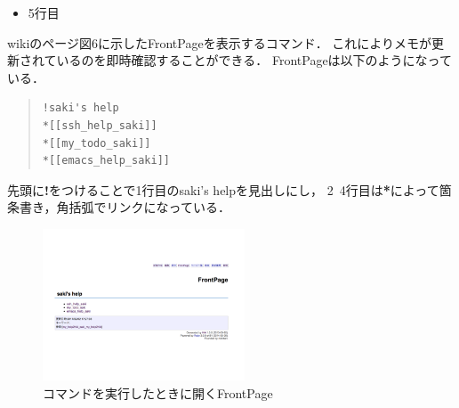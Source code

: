 \begin{itemize}
\item 5行目
\end{itemize}
\begin{description}
\item wikiのページ図6に示したFrontPageを表示するコマンド．
これによりメモが更新されているのを即時確認することができる．
FrontPageは以下のようになっている．
\end{description}
\begin{quote}\begin{verbatim}
!saki's help
*[[ssh_help_saki]]
*[[my_todo_saki]]
*[[emacs_help_saki]]
\end{verbatim}\end{quote}
\begin{description}
\item 先頭に\textbf{!}をつけることで1行目のsaki's helpを見出しにし，
2~4行目は\textbf{*}によって箇条書き，角括弧でリンクになっている．
\end{description}

\begin{figure}[htbp]\begin{center}
\includegraphics[width=6cm,bb=100 100 600 700]{my_help2hiki_saki.002.png}
\caption{コマンドを実行したときに開くFrontPage }
\label{default}\end{center}\end{figure}

